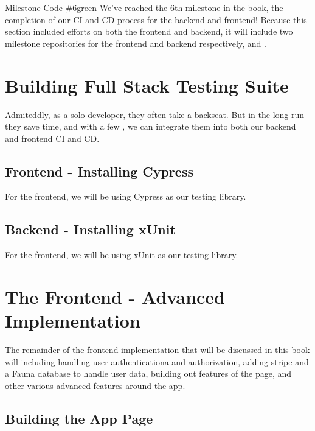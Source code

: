 \documentclass[paper=6in:9in,pagesize=pdftex,headinclude=on,footinclude=on,12pt,twoside]{scrbook}
\begin{document}
\begin{highlightBox}{Milestone Code \#6}{green}{\greenCheck}
We've reached the 6th milestone in the book, the completion of our CI and CD process for the backend and frontend! Because this section included efforts on both the frontend and backend, it will include two milestone repositories for the frontend and backend respectively,  and .
\end{highlightBox}

\chapter{Building Full Stack Testing Suite}

Admiteddly, as a solo developer, they often take a backseat. But in the long run they save time, and with a few , we can integrate them into both our backend and frontend CI and CD.

\section{Frontend - Installing Cypress}

For the frontend, we will be using Cypress as our testing library.

\section{Backend - Installing xUnit}

For the frontend, we will be using xUnit as our testing library.




\chapter{The Frontend - Advanced Implementation}

The remainder of the frontend implementation that will be discussed in this book will including handling user authenticationa and authorization, adding stripe and a Fauna database to handle user data, building out features of the  page, and other various advanced features around the app.

\section{Building the App Page}
\end{document}
